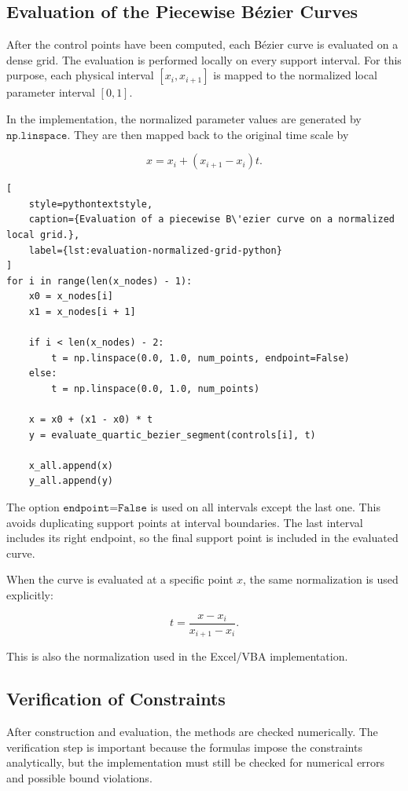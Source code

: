 \documentclass[12pt,a4paper]{article}
\begin{document}
\subsection{Evaluation of the Piecewise B\'ezier Curves}

After the control points have been computed, each B\'ezier curve is evaluated
on a dense grid. The evaluation is performed locally on every support
interval. For this purpose, each physical interval \([x_i,x_{i+1}]\) is
mapped to the normalized local parameter interval \([0,1]\).

In the implementation, the normalized parameter values are generated by
\(\texttt{np.linspace}\). They are then mapped back to the original time
scale by

\[
x=x_i+(x_{i+1}-x_i)t.
\]

\begin{lstlisting}[
    style=pythontextstyle,
    caption={Evaluation of a piecewise B\'ezier curve on a normalized local grid.},
    label={lst:evaluation-normalized-grid-python}
]
for i in range(len(x_nodes) - 1):
    x0 = x_nodes[i]
    x1 = x_nodes[i + 1]

    if i < len(x_nodes) - 2:
        t = np.linspace(0.0, 1.0, num_points, endpoint=False)
    else:
        t = np.linspace(0.0, 1.0, num_points)

    x = x0 + (x1 - x0) * t
    y = evaluate_quartic_bezier_segment(controls[i], t)

    x_all.append(x)
    y_all.append(y)
\end{lstlisting}

The option \(\texttt{endpoint=False}\) is used on all intervals except the
last one. This avoids duplicating support points at interval boundaries. The
last interval includes its right endpoint, so the final support point is
included in the evaluated curve.

When the curve is evaluated at a specific point \(x\), the same normalization
is used explicitly:

\[
t=\frac{x-x_i}{x_{i+1}-x_i}.
\]

This is also the normalization used in the Excel/VBA implementation.

\subsection{Verification of Constraints}

After construction and evaluation, the methods are checked numerically. The
verification step is important because the formulas impose the constraints
analytically, but the implementation must still be checked for numerical
errors and possible bound violations.
\end{document}
